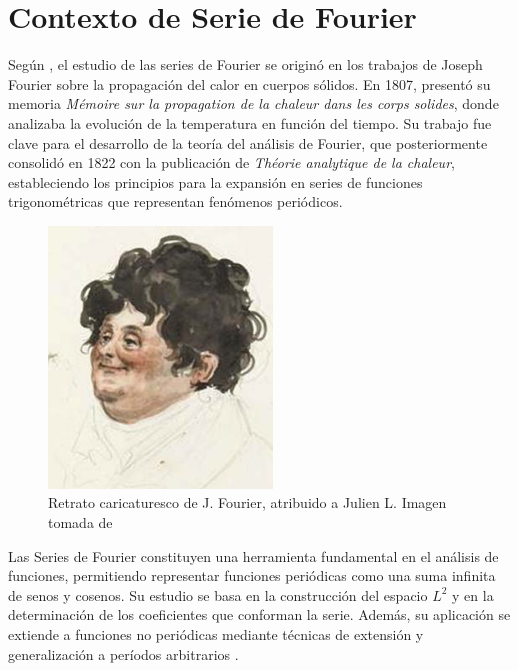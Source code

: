 \chapter[Contexto de Serie de Fourier
]{Contexto de Serie de Fourier}
{
\parindent0pt

Según \citet{Arenas2014}, el estudio de las series de Fourier se originó en los trabajos de Joseph Fourier sobre la propagación del calor en cuerpos sólidos. En 1807, presentó su memoria \textit{Mémoire sur la propagation de la chaleur dans les corps solides}, donde analizaba la evolución de la temperatura en función del tiempo. Su trabajo fue clave para el desarrollo de la teoría del análisis de Fourier, que posteriormente consolidó en 1822 con la publicación de \textit{Théorie analytique de la chaleur}, estableciendo los principios para la expansión en series de funciones trigonométricas que representan fenómenos periódicos.
\vspace{10pt}

\begin{figure}[H]
    \centering
    \includegraphics[height=0.15\textheight]{Figures/retrato.png}
    \caption[Retrato caricaturesco de J. Fourier, atribuido a Julien Leopold Boilly]{Retrato caricaturesco de J. Fourier, atribuido a Julien L. Imagen tomada de  \cite{Arenas2014}}
    \label{fig:retrato}
\end{figure}

Las Series de Fourier constituyen una herramienta fundamental en el análisis de funciones, permitiendo representar funciones periódicas como una suma infinita de senos y cosenos. Su estudio se basa en la construcción del espacio \(L^2\) y en la determinación de los coeficientes que conforman la serie. Además, su aplicación se extiende a funciones no periódicas mediante técnicas de extensión y generalización a períodos arbitrarios \citep{DiagoNanez2023}.

}
